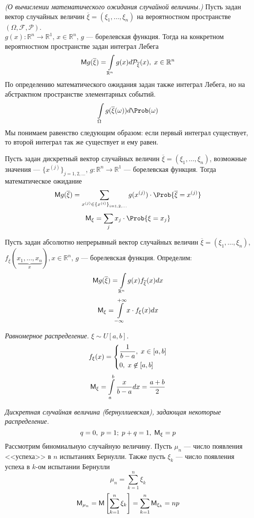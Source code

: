 \begin{theorem} \textit{(О вычислении математического ожидания случайной величины.)} Пусть задан вектор случайных величин $\overline{\xi} = (\xi_1, \ldots, \xi_n)$ на вероятностном пространстве $(\Omega, \mathcal{F}, \mathcal{P})$. \\
$g(x) : \mathbb{R}^n \to \mathbb{R}^1$, $x \in \mathbb{R}^n$, $g$ --- борелевская функция. Тогда на конкретном вероятностном пространстве задан интеграл Лебега
\[
  \mathsf{M} g(\overline\xi) = \int\limits_{\mathbb{R}^n} g(x) d \mathcal{P}_{\overline{\xi}} (x),\; x \in \mathbb{R}^n
\]
По определению математического ожидания задан также интеграл Лебега, но на абстрактном пространстве элементарных событий.
\[
  \int\limits_{\Omega} g (\overline{\xi}(\omega)) d \Prob (\omega)
\]
Мы понимаем равенство следующим образом: если первый интеграл существует, то второй интеграл так же существует и ему равен.
\end{theorem}
\begin{conclusion}
  Пусть задан дискретный вектор случайных величин $\overline{\xi} = (\xi_1, \ldots, \xi_n)$, возможные значения --- ${\{ x^{(j)} \}}_{j = 1, 2, \ldots} $,
  $g : \mathbb{R}^n \to \mathbb{R}^1$ --- борелевская функция. Тогда математическое ожидание
  \[
    \MExpect g(\overline{\xi}) = \sum\limits_{x^{(j)} \in {\{ x^{(i)} \}}_{i = 1, 2, \ldots}} g(x^{(j)}) \cdot \Prob \{ \overline{\xi} = x^{(j)} \}
  \]
  \[
    \MExpect_{\xi} = \sum\limits_j x_j \cdot \Prob \{ \xi = x_j \}
  \]
\end{conclusion}
\begin{conclusion}
  Пусть задан абсолютно непрерывный вектор случайных величин $\overline{\xi} = (\xi_1, \ldots, \xi_n)$, $f_{\overline{\xi}}(\underbrace{x_1, \ldots, x_n}_{x}), x \in \mathbb{R}^n$, $g$ --- борелевская функция. Определим:
  \[
    \mathsf{M} g(\overline{\xi}) = \int\limits_{\mathbb{R}^n} g(x) f_{\overline{\xi}} (x) dx
  \]
  \[
    \mathsf{M}_{\xi} = \int\limits_{-\infty}^{+\infty} x \cdot f_{\xi} (x) dx
  \]
\end{conclusion}
\begin{example} \textit{Равномерное распределение.}
  $\xi \sim U [a, b]$.
  \[
    f_{\xi} (x) = \begin{dcases*}
    \frac{1}{b-a},\; x \in [a, b] \\
    0,\; x \not\in [a, b]
  \end{dcases*}
  \]
  \[
    \mathsf{M}_{\xi} = \int\limits_a^b \frac{x}{b-a} dx = \frac{a+b}{2}
  \]
\end{example}
\begin{example} \textit{Дискретная случайная величина (бернуллиевская), задающая некоторые распределение.}
  \[
    q = 0,\; p = 1;\; p + q = 1,\; \mathsf{M}_{\xi} = p
  \]
  Рассмотрим биномиальную случайную величину. Пусть $\mu_n$ --- число появления <<успеха>> в $n$ испытаниях Бернулли. Также пусть $\xi_k$ --- число появления успеха в $k$-ом испытании Бернулли
  \[
    \mu_n = \sum\limits_{k = 1}^n \xi_k
  \]
  \[
    \mathsf{M}_{\mu_n} = \mathsf{M} \left[ \sum\limits_{k = 1}^n  \xi_k \right] = \sum\limits_{k = 1}^n \mathsf{M}_{\xi_k} = np
  \]
\end{example}
